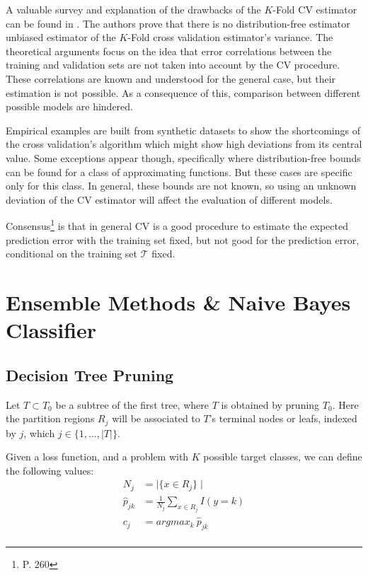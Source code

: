 A valuable survey and explanation of the drawbacks of the $K$-Fold CV estimator can be found in \textcite{bengio-unbiasedCvEstimator}.
The authors prove that there is no distribution-free estimator unbiased estimator of the $K$-Fold cross validation estimator's variance.
The theoretical arguments focus on the idea that error correlations between the training and validation sets are not taken into account by the CV procedure.
These correlations are known and understood for the general case, but their estimation is not possible.
As a consequence of this, comparison between different possible models are hindered.

Empirical examples are built from synthetic datasets to show the shortcomings of the cross validation's algorithm which might show high deviations from its central value.
Some exceptions appear though, specifically where distribution-free bounds can be found for a class of approximating functions.
But these cases are specific only for this class.
In general, these bounds are not known, so using an unknown deviation of the CV estimator will affect the evaluation of different models.

Consensus\footnote{\textcite{hastie-elemstatslearn} P.
	260} is that in general CV is a good procedure to estimate the expected prediction error with the training set fixed, but not good for the prediction error, conditional on the training set $\mathcal{T}$ fixed.



\chapter{Ensemble Methods \& Naive Bayes Classifier}\label{appx:ensembleBayes}

\section{Decision Tree Pruning}\label{appx:sec:tree_pruning}

Let $T \subset T_0$ be a subtree of the first tree, where $T$ is obtained by pruning $T_0$. Here the partition regions $R_j$ will be associated to $T$'s terminal nodes or leafs, indexed by $j$, which $j \in \{1,\ldots,|T| \}$.

Given a loss function, and a problem with $K$ possible target classes, we can define the following values:
\begin{equation}
\begin{split}
N_j & = \mid \{x \in R_j \}\mid \\
\hat{p}_{jk} & = \frac{1}{N_j} \sum_{x \in R_j} I(y=k)\\
c_j & = argmax_{k} \ \hat{p}_{jk} \\
\end{split}
\end{equation}\label{eq:decisionTreePruneParameters}

